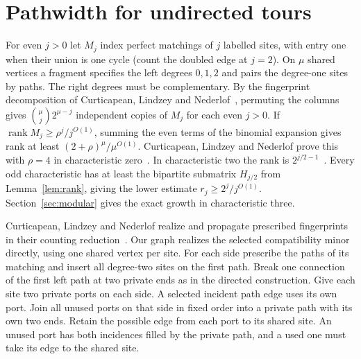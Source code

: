 \documentclass[11pt]{article}
\theoremstyle{definition}
\newcommand{\rank}{\operatorname{rank}}
\begin{document}
\section{Pathwidth for undirected tours}\label{sec:quant-transfer}

For even \(j>0\) let \(M_j\) index perfect matchings of \(j\) labelled sites, with entry one when their union is one cycle (count the doubled edge at \(j=2\)). On \(\mu\) shared vertices a fragment specifies the left degrees \(0,1,2\) and pairs the degree-one sites by paths. The right degrees must be complementary. By the fingerprint decomposition of Curticapean, Lindzey and Nederlof~\cite[Fact~2.2]{cln}, permuting the columns gives \(\binom \mu j2^{\mu-j}\) independent copies of \(M_j\) for each even \(j>0\). If \(\rank M_j\ge \rho^j/j^{O(1)}\), summing the even terms of the binomial expansion gives rank at least \((2+\rho)^\mu/\mu^{O(1)}\). Curticapean, Lindzey and Nederlof prove this with \(\rho=4\) in characteristic zero~\cite{cln}. In characteristic two the rank is \(2^{j/2-1}\)~\cite{ckn}. Every odd characteristic has at least the bipartite submatrix \(H_{j/2}\) from Lemma~\ref{lem:rank}, giving the lower estimate \(r_j\ge 2^j/j^{O(1)}\). Section~\ref{sec:modular} gives the exact growth in characteristic three.

Curticapean, Lindzey and Nederlof realize and propagate prescribed fingerprints in their counting reduction~\cite[Lemmas~5.2 and~5.5]{cln}. Our graph realizes the selected compatibility minor directly, using one shared vertex per site. For each side prescribe the paths of its matching and insert all degree-two sites on the first path. Break one connection of the first left path at two private ends as in the directed construction. Give each site two private ports on each side. A selected incident path edge uses its own port. Join all unused ports on that side in fixed order into a private path with its own two ends. Retain the possible edge from each port to its shared site. An unused port has both incidences filled by the private path, and a used one must take its edge to the shared site.
\end{document}
